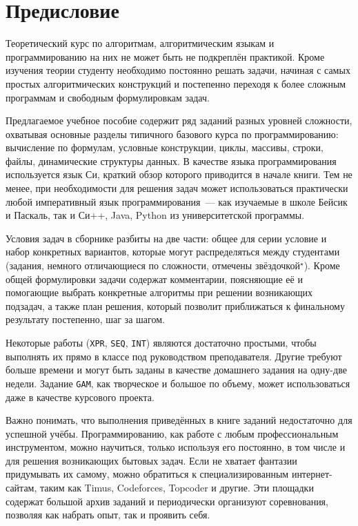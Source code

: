 \chapter{Предисловие}

Теоретический курс по алгоритмам, алгоритмическим языкам и программированию на них не может быть не
подкреплён практикой. Кроме изучения теории студенту необходимо постоянно решать задачи, начиная с
самых простых алгоритмических конструкций и постепенно переходя к более сложным программам
и свободным формулировкам задач.

Предлагаемое учебное пособие содержит ряд заданий разных уровней сложности, охватывая основные
разделы типичного базового курса по программированию: вычисление по формулам, условные конструкции,
циклы, массивы, строки, файлы, динамические структуры данных. В качестве языка программирования
используется язык Си, краткий обзор которого приводится в начале книги. Тем не менее, при
необходимости для решения задач может использоваться практически любой императивный язык
программирования~--- как изучаемые в школе Бейсик и Паскаль, так и Си++, Java, Python из
университетской программы.

Условия задач в сборнике разбиты на две части: общее для серии условие и набор конкретных вариантов,
которые могут распределяться между студентами (задания, немного отличающиеся по сложности, отмечены
звёздочкой$^\star$). Кроме общей формулировки задачи содержат комментарии, поясняющие её и
помогающие выбрать конкретные алгоритмы при решении возникающих подзадач, а также план решения,
который позволит приближаться к финальному результату постепенно, шаг за шагом.

Некоторые работы (\texttt{XPR}, \texttt{SEQ}, \texttt{INT}) являются достаточно простыми, чтобы
выполнять их прямо в классе под руководством преподавателя. Другие требуют больше времени и могут
быть заданы в качестве домашнего задания на одну-две недели. Задание \texttt{GAM}, как творческое и
большое по объему, может использоваться даже в качестве курсового проекта.

Важно понимать, что выполнения приведённых в книге заданий недостаточно для успешной учёбы.
Программированию, как работе с любым профессиональным инструментом, можно научиться, только
используя его постоянно, в том числе и для решения возникающих бытовых задач. Если не хватает
фантазии придумывать их самому, можно обратиться к специализированным интернет-сайтам, таким как
Timus, Codeforces, Topcoder и другие. Эти площадки содержат большой архив заданий и периодически
организуют соревнования, позволяя как набрать опыт, так и проявить себя.

